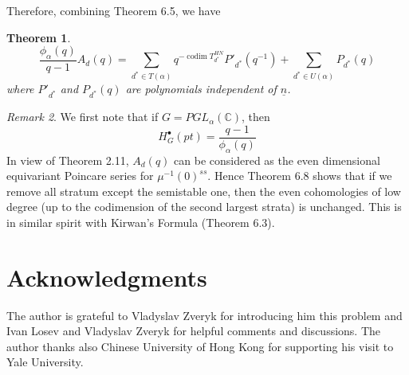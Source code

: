 \documentclass[12pt]{amsart}
\theoremstyle{plain}
\newtheorem{thm}{Theorem}[section]
\theoremstyle{definition}
\theoremstyle{remark}
\newtheorem{rem}[thm]{Remark}
\begin{document}
Therefore, combining Theorem 6.5, we have
\begin{thm}
$$\frac{\phi_{\alpha}(q)}{q-1}A_d(q)=\sum_{d^*\in T(\alpha)}q^{-\operatorname{codim}T_{d^*}^{HN}}P'_{d^*}(q^{-1})+\sum_{d^*\in U(\alpha)}P_{d^*}(q)$$
where $P'_{d^*}$ and $P_{d^*}(q)$ are polynomials independent of $\underline{n}$. 
\end{thm}
\begin{rem}
    We first note that if $G=PGL_{\alpha}(\mathbb C)$, then
    $$H_{G}^{\bullet}(pt)=\frac{q-1}{\phi_{\alpha}(q)}$$
    In view of Theorem 2.11, $A_{d}(q)$ can be considered as the even dimensional equivariant Poincare series for $\mu^{-1}(0)^{ss}$. Hence Theorem 6.8 shows that if we remove all stratum except the semistable one, then the even cohomologies of low degree (up to the codimension of the second largest strata) is unchanged. This is in similar spirit with Kirwan's Formula (Theorem 6.3).
\end{rem}
\section*{Acknowledgments}
The author is grateful to Vladyslav Zveryk for introducing him this problem and Ivan Losev and Vladyslav Zveryk for helpful comments and discussions. The author thanks also Chinese University of Hong Kong for supporting his visit to Yale University.
\end{document}
